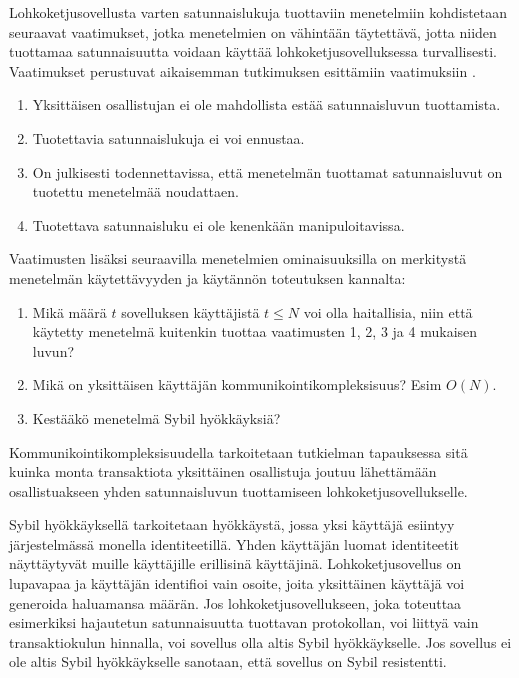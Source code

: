 Lohkoketjusovellusta varten satunnaislukuja tuottaviin menetelmiin kohdistetaan seuraavat vaatimukset, jotka menetelmien on vähintään täytettävä, jotta niiden tuottamaa satunnaisuutta voidaan käyttää lohkoketjusovelluksessa turvallisesti. Vaatimukset perustuvat aikaisemman tutkimuksen esittämiin vaatimuksiin \cite{cherniaeva2019homomorphic, schindler_hydrand_2020, syta_scalable_2017}. 

\begin{enumerate}
    \item Yksittäisen osallistujan ei ole mahdollista estää satunnaisluvun tuottamista.
    \item Tuotettavia satunnaislukuja ei voi ennustaa.
    \item On julkisesti todennettavissa, että menetelmän tuottamat satunnaisluvut on tuotettu menetelmää noudattaen.
    \item Tuotettava satunnaisluku ei ole kenenkään manipuloitavissa.
\end{enumerate}

Vaatimusten lisäksi seuraavilla menetelmien ominaisuuksilla on merkitystä menetelmän käytettävyyden ja käytännön toteutuksen kannalta:

\begin{enumerate}
    \item Mikä määrä $t$ sovelluksen käyttäjistä $t \leq N$ voi olla haitallisia, niin että käytetty menetelmä kuitenkin tuottaa vaatimusten 1, 2, 3 ja 4 mukaisen luvun?
    \item Mikä on yksittäisen käyttäjän kommunikointikompleksisuus? Esim $O(N)$.
    \item Kestääkö menetelmä Sybil hyökkäyksiä?
\end{enumerate}

Kommunikointikompleksisuudella tarkoitetaan tutkielman tapauksessa sitä kuinka monta transaktiota yksittäinen osallistuja joutuu lähettämään osallistuakseen yhden satunnaisluvun tuottamiseen lohkoketjusovellukselle. 

Sybil hyökkäyksellä \cite{douceur2002sybil} tarkoitetaan hyökkäystä, jossa yksi käyttäjä esiintyy järjestelmässä monella identiteetillä. Yhden käyttäjän luomat identiteetit näyttäytyvät muille käyttäjille erillisinä käyttäjinä. Lohkoketjusovellus on lupavapaa ja käyttäjän identifioi vain osoite, joita yksittäinen käyttäjä voi generoida haluamansa määrän. Jos lohkoketjusovellukseen, joka toteuttaa esimerkiksi hajautetun satunnaisuutta tuottavan protokollan, voi liittyä vain transaktiokulun hinnalla, voi sovellus olla altis Sybil hyökkäykselle. Jos sovellus ei ole altis Sybil hyökkäykselle sanotaan, että sovellus on Sybil resistentti.